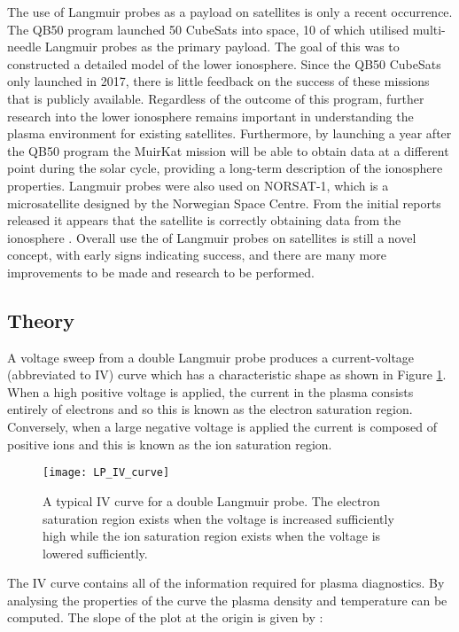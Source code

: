 The use of Langmuir probes as a payload on satellites is only a recent occurrence. The QB50 program launched 50 CubeSats into space, 10 of which utilised multi-needle Langmuir probes as the primary payload. The goal of this was to constructed a detailed model of the lower ionosphere. Since the QB50 CubeSats only launched in 2017, there is little feedback on the success of these missions that is publicly available. Regardless of the outcome of this program, further research into the lower ionosphere remains important in understanding the plasma environment for existing satellites. Furthermore, by launching a year after the QB50 program the MuirKat mission will be able to obtain data at a different point during the solar cycle, providing a long-term description of the ionosphere properties. Langmuir probes were also used on NORSAT-1, which is a microsatellite designed by the Norwegian Space Centre. From the initial reports released it appears that the satellite is correctly obtaining data from the ionosphere \cite{university_of_toronto_institute_for_aerospace_studies_space_flight_laboratory_norwegian_2017}. Overall use the of Langmuir probes on satellites is still a novel concept, with early signs indicating success, and there are many more improvements to be made and research to be performed.

\subsection{Theory}
A voltage sweep from a double Langmuir probe produces a current-voltage (abbreviated to IV) curve which has a characteristic shape as shown in Figure \ref{fig:LP_IV_curve}. When a high positive voltage is applied, the current in the plasma consists entirely of electrons and so this is known as the electron saturation region. Conversely, when a large negative voltage is applied the current is composed of positive ions and this is known as the ion saturation region.\\

\begin{figure}[h]
	\centering
	\texttt{[image: LP\_IV\_curve]}
	\caption{A typical IV curve for a double Langmuir probe. The electron saturation region exists when the voltage is increased sufficiently high while the ion saturation region exists when the voltage is lowered sufficiently.}
	\label{fig:LP_IV_curve}
\end{figure}

The IV curve contains all of the information required for plasma diagnostics. By analysing the properties of the curve the plasma density and temperature can be computed. The slope of the plot at the origin is given by \cite{naz_development_2014}:

